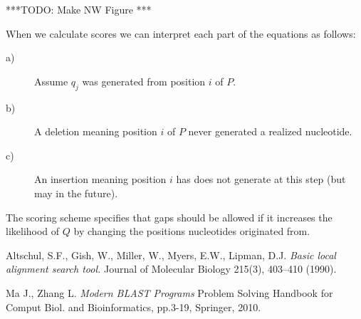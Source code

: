 \documentclass[10pt]{IEEEtran}
\begin{document}
***TODO: Make NW Figure ***

When we calculate scores we can interpret each part of the equations as follows:

\begin{description}
  \item[a)] Assume $q_j$ was generated from position $i$ of $P$.
  \item[b)] A deletion meaning position $i$ of $P$ never generated a realized nucleotide.
  \item[c)] An insertion meaning position $i$ has does not generate at this step (but may in the future).
\end{description}

The scoring scheme specifies that gaps should be allowed if it increases the likelihood of $Q$ by changing the positions nucleotides originated from.
\begin{thebibliography}{9}

Altschul, S.F., Gish, W., Miller, W., Myers, E.W., Lipman, D.J. 
\emph{Basic local alignment search tool. }
Journal of Molecular Biology 215(3), 403–410 (1990).

Ma J., Zhang L.
\emph{Modern BLAST Programs}
Problem Solving Handbook for Comput Biol. and Bioinformatics, pp.3-19, Springer, 2010.


\end{thebibliography}
\end{document}
